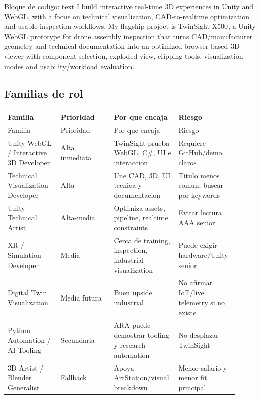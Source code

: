 \begin{mdcode}
Bloque de codigo: text
I build interactive real-time 3D experiences in Unity and WebGL, with a focus on technical visualization, CAD-to-realtime optimization and usable inspection workflows. My flagship project is TwinSight X500, a Unity WebGL prototype for drone assembly inspection that turns CAD/manufacturer geometry and technical documentation into an optimized browser-based 3D viewer with component selection, exploded view, clipping tools, visualization modes and usability/workload evaluation.
\end{mdcode}


\subsection{Familias de rol}


\begin{center}
\scriptsize
\begin{longtable}{>{\raggedright\arraybackslash}p{0.225\linewidth} >{\raggedright\arraybackslash}p{0.225\linewidth} >{\raggedright\arraybackslash}p{0.225\linewidth} >{\raggedright\arraybackslash}p{0.225\linewidth}}
\toprule
Familia & Prioridad & Por que encaja & Riesgo \\
\midrule
\endfirsthead
\toprule
Familia & Prioridad & Por que encaja & Riesgo \\
\midrule
\endhead
Unity WebGL / Interactive 3D Developer & Alta inmediata & TwinSight prueba WebGL, C\#, UI e interaccion & Requiere GitHub/demo claros \\
Technical Visualization Developer & Alta & Une CAD, 3D, UI tecnica y documentacion & Titulo menos comun; buscar por keywords \\
Unity Technical Artist & Alta-media & Optimiza assets, pipeline, realtime constraints & Evitar lectura AAA senior \\
XR / Simulation Developer & Media & Cerca de training, inspection, industrial visualization & Puede exigir hardware/Unity senior \\
Digital Twin Visualization & Media futura & Buen upside industrial & No afirmar IoT/live telemetry si no existe \\
Python Automation / AI Tooling & Secundaria & ARA puede demostrar tooling y research automation & No desplazar TwinSight \\
3D Artist / Blender Generalist & Fallback & Apoya ArtStation/visual breakdown & Menor salario y menor fit principal \\
\bottomrule
\end{longtable}
\end{center}


